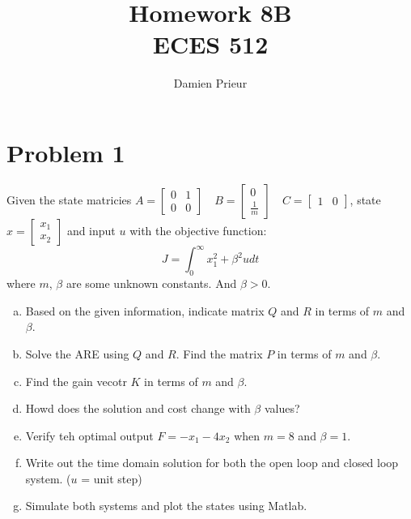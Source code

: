\documentclass{article}
\author{Damien Prieur}
\title{Homework 8B\\ ECES 512}
\date{}
\begin{document}
\maketitle

\section*{Problem 1}
Given the state matricies $A = \begin{bmatrix} 0 & 1 \\ 0 & 0 \end{bmatrix} \quad B = \begin{bmatrix} 0 \\ \frac{1}{m} \end{bmatrix} \quad C = \begin{bmatrix} 1 & 0 \end{bmatrix}$, state $x = \begin{bmatrix} x_1 \\ x_2 \end{bmatrix}$ and input $u$ with the objective function:
$$ J = \int_0^\infty x_1^2+\beta^2 u dt $$
where $m$, $\beta$ are some unknown constants. And $\beta > 0$.

\begin{enumerate}[a.]
\item Based on the given information, indicate matrix $Q$ and $R$ in terms of $m$ and $\beta$.
\newline

\item Solve the ARE using $Q$ and $R$.
Find the matrix $P$ in terms of $m$ and $\beta$.
\newline

\item Find the gain vecotr $K$ in terms of $m$ and $\beta$.
\newline

\item Howd does the solution and cost change with $\beta$ values?
\newline

\item Verify teh optimal output $F = -x_1 -4x_2$ when $m = 8$ and $\beta = 1$.
\newline

\item Write out the time domain solution for both the open loop and closed loop system. ($u$ = unit step)
\newline

\item Simulate both systems and plot the states using Matlab.
\newline

\end{enumerate}
\end{document}
